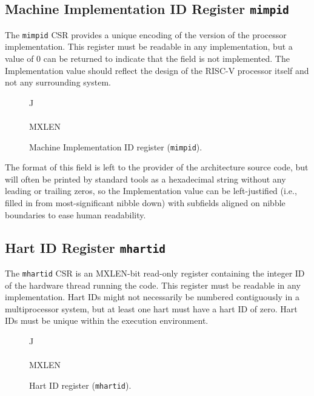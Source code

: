 \subsection{Machine Implementation ID Register {\tt mimpid}}

The {\tt mimpid} CSR provides a unique encoding of the version of the
processor implementation.  This register must be readable in any
implementation, but a value of 0 can be returned to indicate that the
field is not implemented.  The Implementation value should reflect the
design of the RISC-V processor itself and not any surrounding system.

\begin{figure*}[h!]
{\footnotesize
\begin{center}
\begin{tabular}{J}
 \\
\hline
{}  \\
\hline
MXLEN \\
\end{tabular}
\end{center}
}
\vspace{-0.1in}
\caption{Machine Implementation ID register ({\tt mimpid}).}
\label{mimpidreg}
\end{figure*}

\begin{commentary}
The format of this field is left to the provider of the architecture
source code, but will often be printed by standard tools as a
hexadecimal string without any leading or trailing zeros, so the
Implementation value can be left-justified (i.e., filled in from
most-significant nibble down) with subfields aligned on nibble
boundaries to ease human readability.
\end{commentary}

\subsection{Hart ID Register {\tt mhartid}}

The {\tt mhartid} CSR is an MXLEN-bit read-only register
containing the integer ID of the hardware thread running the code.
This register must be readable in any implementation.  Hart IDs might
not necessarily be numbered contiguously in a multiprocessor system,
but at least one hart must have a hart ID of zero.  Hart IDs must be
unique within the execution environment.

\begin{figure*}[h!]
{\footnotesize
\begin{center}
\begin{tabular}{J}
 \\
\hline
{}\\
\hline
MXLEN \\
\end{tabular}
\end{center}
}
\vspace{-0.1in}
\caption{Hart ID register ({\tt mhartid}).}
\label{mhartidreg}
\end{figure*}


